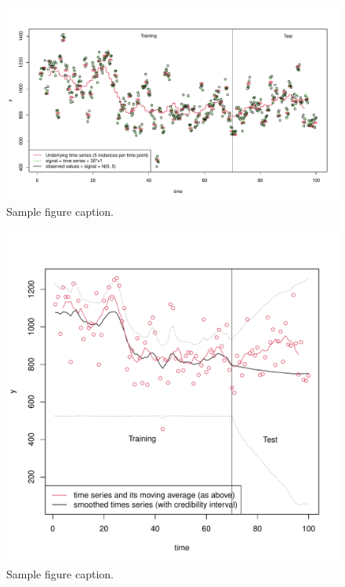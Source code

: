\documentclass{article}
\begin{document}
\begin{figure}
	\centering
	\includegraphics{visualize_simulated_data.pdf}
	\caption{Sample figure caption.}
	\label{fig:fig1}
\end{figure}

\begin{figure}
	\centering
	\includegraphics{smoothed_time_series.pdf}
	\caption{Sample figure caption.}
	\label{fig:fig1}
\end{figure}
\end{document}
